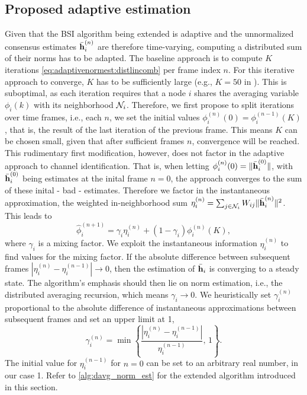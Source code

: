 \documentclass{article}
\begin{document}
\subsection[]{Proposed adaptive estimation}
Given that the BSI algorithm being extended \cite{blochbergerDBSI} is adaptive and the unnormalized consensus estimates \(\bar{\bm{\mathrm{h}}}_i^{(n)}\) are therefore time-varying, computing a distributed sum of their norms has to be adapted.
The baseline approach is to compute \(K\) iterations \eqref{eq:adaptivenormest:distlincomb} per frame index \(n\).
For this iterative approach to converge, \(K\) has to be sufficiently large (e.g., \(K=50\) in \cite{yuDistributedBlindSystem2014,liuDistributedBlindIdentification2016}).
This is suboptimal, as each iteration requires that a node \(i\) shares the averaging variable \(\phi_i(k)\) with its neighborhood \(\mathcal{N}_i\).
Therefore, we first propose to split iterations over time frames, i.e., each \(n\), we set the initial values \(\phi_i^{(n)}(0) = \phi_i^{(n-1)}(K)\), that is, the result of the last iteration of the previous frame.
This means \(K\) can be chosen small, given that after sufficient frames \(n\), convergence will be reached.
This rudimentary first modification, however, does not factor in the adaptive approach to channel identification.
That is, when letting \(\phi_i^{(n)}(0) = \|\bar{\bm{\mathrm{h}}}_i^{(0)}\|\), with \(\bar{\bm{\mathrm{h}}}_i^{(0)}\) being estimates at the inital frame \(n=0\), the approach converges to the sum of these inital - bad - estimates.
Therefore we factor in the instantaneous approximation, the weighted in-neighborhood sum \(\eta_i^{(n)} = \sum_{j \in \mathcal{N}_i} W_{ij} \|\bar{\bm{\mathrm{h}}}_i^{(n)}\|^2\).
This leads to
\begin{equation}
    \hat{\phi}_i^{(n+1)} = \gamma_i \eta_i^{(n)} + (1-\gamma_i) \phi_i^{(n)}(K),
\end{equation}
where \(\gamma_i\) is a mixing factor.
We exploit the instantaneous information \(\eta_i^{(n)}\) to find values for the mixing factor.
If the absolute difference between subsequent frames \(| \eta_i^{(n)} - \eta_i^{(n-1)} | \to 0\), then the estimation of \(\bar{\bm{\mathrm{h}}}_i\) is converging to a steady state.
The algorithm's emphasis should then lie on norm estimation, i.e., the distributed averaging recursion, which means \(\gamma_i \to 0\).
We heuristically set \(\gamma_i^{(n)}\) proportional to the absolute difference of instantaneous approximations between subsequent frames and set an upper limit at 1,
\begin{equation}
    \gamma_i^{(n)} = \min \left\lbrace \frac{| \eta_i^{(n)} - \eta_i^{(n-1)} |}{\eta_i^{(n-1)}},\,1\right\rbrace.\label{eq:adaptivenormest:adaptivegamma}
\end{equation}
The initial value for \(\eta_i^{(n-1)}\) for \(n=0\) can be set to an arbitrary real number, in our case 1.
Refer to \autoref{alg:davg_norm_est} for the extended algorithm introduced in this section.
\end{document}

